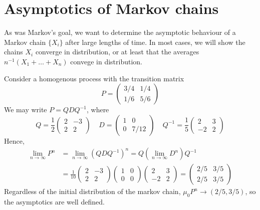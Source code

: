 \section{Asymptotics of Markov chains}

As was Markov's goal, we want to determine the asymptotic behaviour of a Markov chain $\{X_i\}$ after large lengths of time. In most cases, we will show the chains $X_i$ converge in distribution, or at least that the averages $n^{-1}(X_1 + \dots + X_n)$ convege in distribution.

\begin{example}
    Consider a homogenous process with the transition matrix
    \[ P = \begin{pmatrix} 3/4 & 1/4 \\ 1/6 & 5/6 \end{pmatrix} \]
    We may write $P = QDQ^{-1}$, where
    \[ Q = \frac{1}{2} \begin{pmatrix} 2 & -3 \\ 2 & 2 \end{pmatrix} \ \ \ \ \ D = \begin{pmatrix} 1 & 0 \\ 0 & 7/12 \end{pmatrix} \ \ \ \ \ Q^{-1} = \frac{1}{5} \begin{pmatrix} 2 & 3 \\ -2 & 2 \end{pmatrix} \]
    Hence,
    \begin{align*}
        \lim_{n \to \infty} P^n &= \lim_{n \to \infty} (QDQ^{-1})^n = Q (\lim_{n \to \infty} D^n) Q^{-1}\\
        &= \frac{1}{10} \begin{pmatrix} 2 & -3 \\ 2 & 2 \end{pmatrix} \begin{pmatrix} 1 & 0 \\ 0 & 0 \end{pmatrix} \begin{pmatrix} 2 & 3 \\ -2 & 2 \end{pmatrix} = \begin{pmatrix} 2/5 & 3/5 \\ 2/5 & 3/5 \end{pmatrix}
    \end{align*}
    Regardless of the initial distribution of the markov chain, $\mu_0P^n \to (2/5, 3/5)$, so the asymptotics are well defined.
\end{example}

